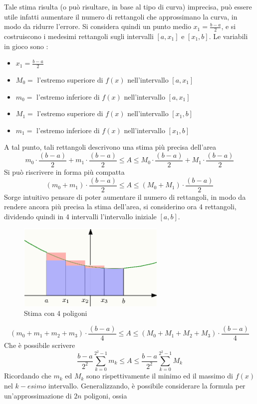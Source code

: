 \documentclass[10pt, letterpaper]{report}
\begin{document}
Tale stima risulta (o può risultare, in base al tipo di curva)
imprecisa, può essere utile infatti aumentare il numero di rettangoli
che approssimano la curva, in modo da ridurre l'errore. Si considera
quindi un punto medio $x_1=\frac{b-a}{2}$, e si costruiscono i medesimi rettangoli
sugli intervalli $[a,x_1]$ e $[x_1,b]$. Le variabili in gioco sono : \begin{itemize}
    \item $x_1=\frac{b-a}{2}$
    \item $M_0 = $ l'estremo superiore di $f(x)$ nell'intervallo $[a,x_1]$
    \item $m_0 = $ l'estremo inferiore di $f(x)$ nell'intervallo $[a,x_1]$
    \item $M_1 = $ l'estremo superiore di $f(x)$ nell'intervallo $[x_1,b]$
    \item $m_1 = $ l'estremo inferiore di $f(x)$ nell'intervallo $[x_1,b]$
\end{itemize}
A tal punto, tali rettangoli descrivono una stima più precisa dell'area
$$ m_0 \cdot \frac{(b-a)}{2}+m_1\cdot \frac{(b-a)}{2} \le A\le M_0 \cdot \frac{(b-a)}{2}+M_1\cdot \frac{(b-a)}{2}$$
Si può riscrivere in forma più compatta
$$(m_0+m_1) \cdot \frac{(b-a)}{2} \le A\le (M_0+M_1) \cdot \frac{(b-a)}{2}$$
Sorge intuitivo pensare di poter aumentare il numero di rettangoli, in modo da
rendere ancora più precisa la stima dell'area, si considerino ora 4 rettangoli, dividendo
quindi in 4 intervalli l'intervallo iniziale $[a,b]$.
\begin{figure}[h!]
    \centering
    \includegraphics[width=200pt ]{images/integrale3.eps}
    \caption{Stima con 4 poligoni}
    \label{fig:int3}
\end{figure}
$$ (m_0+m_1+m_2+m_3) \cdot \frac{(b-a)}{4}
    \le A\le (M_0+M_1+M_2+M_3) \cdot \frac{(b-a)}{4}$$
Che è possibile scrivere
$$ \frac{b-a}{2^2}\displaystyle \sum_{k=0}^{2^2-1}m_k
    \le A \le \frac{b-a}{2^2}\displaystyle \sum_{k=0}^{2^2-1}M_k$$
Ricordando che $m_k$ ed $M_k$ sono rispettivamente il minimo ed il massimo
di $f(x)$ nel $k-esimo$ intervallo. Generalizzando, è possibile considerare
la formula per un'approssimazione di $2n$ poligoni, ossia
\end{document}
